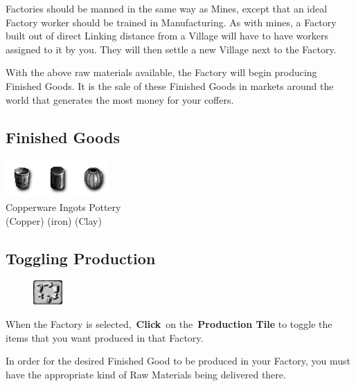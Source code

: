 Factories should be manned in the same way as Mines, except that an ideal Factory worker should be trained in Manufacturing. As with mines, a Factory built out of direct Linking distance from a Village will have to have workers assigned to it by you. They will then settle a new Village next to the Factory.

With the above raw materials available, the Factory will begin producing Finished Goods. It is the sale of these Finished Goods in markets around the world that generates the most money for your coffers.

\subsection{Finished Goods}

\begin{center}
	\includegraphics[width=0.5\linewidth]{Igoods}
	\\ Copperware Ingots Pottery
	\\ (Copper) (iron) (Clay)
\end{center}

\subsection{Toggling Production}

\begin{figure}
	\vspace{-20pt}
	\begin{center}
		\includegraphics[width=0.1\textwidth]{Tgoodcycling}
	\end{center}
	\vspace{-20pt}
\end{figure}

When the Factory is selected, \textbf{Click} on the \textbf{Production Tile} to toggle the items that you want produced in that Factory.

In order for the desired Finished Good to be produced in your Factory, you must have the appropriate kind of Raw Materials being delivered there.

